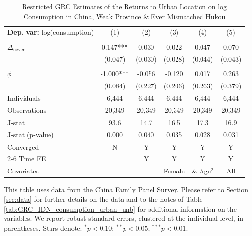 \begin{table}[htbp] \centering \begin{threeparttable}
 \caption{Restricted GRC Estimates of the Returns to Urban Location on log Consumption in China, Weak Province & Ever Mismatched Hukou} 
 \label{tab:GRC_CHN_w_m_consumption_urban_unb} 
\begin{tabular}{l ccccc} \toprule  \textbf{Dep. var:}  log(consumption) 
                    &\multicolumn{1}{c}{(1)}   &\multicolumn{1}{c}{(2)}   &\multicolumn{1}{c}{(3)}   &\multicolumn{1}{c}{(4)}   &\multicolumn{1}{c}{(5)}   \\
                    &               &               &               &               &               \\
\addlinespace
$\Delta_{\text{never}}$&       0.147***&       0.030   &       0.022   &       0.047   &       0.070   \\
                    &     (0.047)   &     (0.030)   &     (0.028)   &     (0.044)   &     (0.043)   \\
                    &               &               &               &               &               \\
\addlinespace
$\phi$              &      -1.000***&      -0.056   &      -0.120   &       0.017   &       0.263   \\
                    &     (0.084)   &     (0.227)   &     (0.206)   &     (0.263)   &     (0.379)   \\
\addlinespace
Individuals         &       6,444   &       6,444   &       6,444   &       6,444   &       6,444   \\
Observations        &      20,349   &      20,349   &      20,349   &      20,349   &      20,349   \\
J-stat              &        93.6   &        14.7   &        16.5   &        17.3   &        16.9   \\
J-stat (p-value)    &       0.000   &       0.040   &       0.035   &       0.028   &       0.031   \\
Converged           &           N   &           Y   &           Y   &           Y   &           Y   \\
\cmidrule{2-6} Time FE & & Y & Y & Y & Y \\ Covariates & & & Female & \& Age$^2$ & All \\ \bottomrule \end{tabular} \begin{tablenotes}[flushleft] \footnotesize \item{This table uses data from the China Family Panel Survey. Please refer to Section \ref{sec:data} for further details on the data and to the notes of Table \ref{tab:GRC_IDN_consumption_urban_unb} for additional information on the variables. We report robust standard errors, clustered at the individual level, in parentheses. Stars denote: $^{*} p<0.10$; $^{**} p<0.05$; $^{***} p<0.01$.} \end{tablenotes} \end{threeparttable} \end{table}
